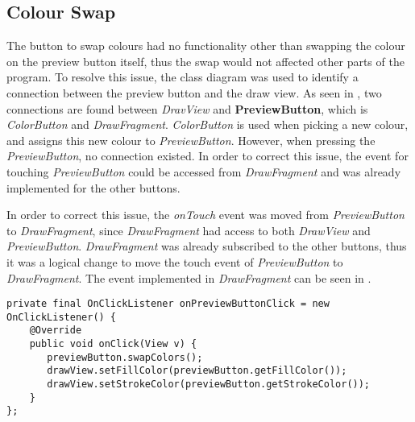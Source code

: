 \subsection{Colour Swap}
The button to swap colours had no functionality other than swapping the colour on the preview button itself, thus the swap would not affected other parts of the program.
To resolve this issue, the class diagram was used to identify a connection between the preview button and the draw view.
As seen in , two connections are found between \textit{DravView} and \textbf{PreviewButton}, which is \textit{ColorButton} and \textit{DrawFragment}.
\textit{ColorButton} is used when picking a new colour, and assigns this new colour to \textit{PreviewButton}.
However, when pressing the \textit{PreviewButton}, no connection existed.
In order to correct this issue, the event for touching \textit{PreviewButton} could be accessed from \textit{DrawFragment} and was already implemented for the other buttons. 

In order to correct this issue, the \textit{onTouch} event was moved from \textit{PreviewButton} to \textit{DrawFragment}, since \textit{DrawFragment} had access to both \textit{DrawView} and \textit{PreviewButton}.
\textit{DrawFragment} was already subscribed to the other buttons, thus it was a logical change to move the touch event of \textit{PreviewButton} to \textit{DrawFragment}.
The event implemented in \textit{DrawFragment} can be seen in .

\begin{lstlisting}[caption={onPreviewButtonClick event},label=lst:event-previewbuttonclick]
private final OnClickListener onPreviewButtonClick = new OnClickListener() {
    @Override
    public void onClick(View v) {
       previewButton.swapColors();
       drawView.setFillColor(previewButton.getFillColor());
       drawView.setStrokeColor(previewButton.getStrokeColor());
    }
};
\end{lstlisting}